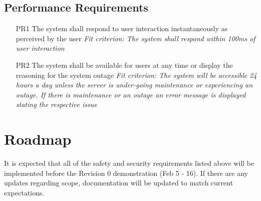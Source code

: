 \documentclass{article}
\begin{document}
\subsection{Performance Requirements}
\begin{enumerate}
    \item[PR1] The system shall respond to user interaction instantaneously as perceived by the user\newline
    \textit{Fit criterion: The system shall respond within 100ms of user interaction}
    \item[PR2] The system shall be available for users at any time or display the reasoning for the system outage \newline
    \textit{Fit criterion: The system will be accessible 24 hours a day unless the server is under-going maintenance or experiencing an outage. If there is maintenance or an outage an error message is displayed stating the respective issue}
\end{enumerate}


\section{Roadmap}

It is expected that all of the safety and security requirements listed above will be implemented before the Revision 0 demonstration (Feb 5 - 16). If there are any updates regarding scope, documentation will be updated to match current expectations.

\end{document}
